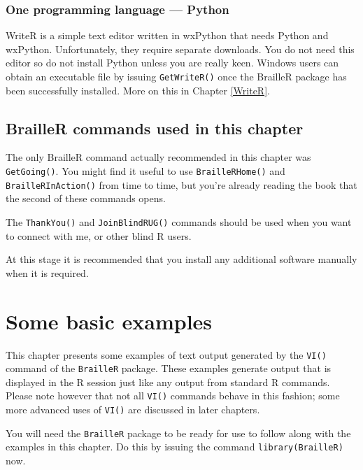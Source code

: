\documentclass[
]{book}
\begin{document}
\hypertarget{one-programming-language-python}{%
\subsection{One programming language --- Python}\label{one-programming-language-python}}

WriteR is a simple text editor written in wxPython that needs Python and wxPython. Unfortunately, they require separate downloads. You do not need this editor so do not install Python unless you are really keen. Windows users can obtain an executable file by issuing \texttt{GetWriteR()} once the BrailleR package has been successfully installed. More on this in Chapter \ref{WriteR}.

\hypertarget{brailler-commands-used-in-this-chapter}{%
\section{BrailleR commands used in this chapter}\label{brailler-commands-used-in-this-chapter}}

The only BrailleR command actually recommended in this chapter was \texttt{GetGoing()}. You might find it useful to use \texttt{BrailleRHome()} and \texttt{BrailleRInAction()} from time to time, but you're already reading the book that the second of these commands opens.

The \texttt{ThankYou()} and \texttt{JoinBlindRUG()} commands should be used when you want to connect with me, or other blind R users.

At this stage it is recommended that you install any additional software manually when it is required.

\hypertarget{VI}{%
\chapter{Some basic examples}\label{VI}}

This chapter presents some examples of text output generated by the \texttt{VI()} command of the \texttt{BrailleR} package. These examples generate output that is displayed in the R session just like any output from standard R commands. Please note however that not all \texttt{VI()} commands behave in this fashion; some more advanced uses of \texttt{VI()} are discussed in later chapters.

You will need the \texttt{BrailleR} package to be ready for use to follow along with the examples in this chapter. Do this by issuing the command \texttt{library(BrailleR)} now.
\end{document}
